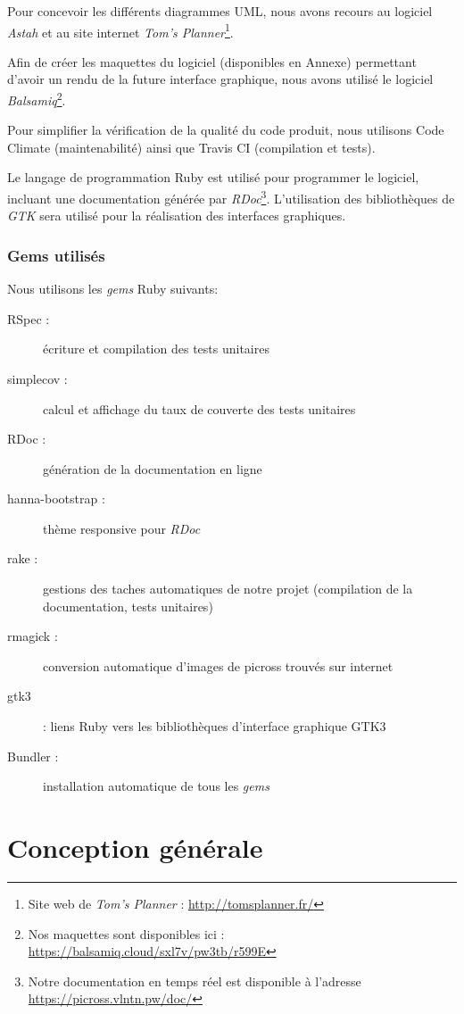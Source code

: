 \documentclass{report}
\makeatletter
\newcommand\footnoteref[1]{\protected@xdef\@thefnmark{\ref{#1}}\@footnotemark}
\makeatother
\begin{document}
	Pour concevoir les différents diagrammes UML, nous avons recours au logiciel \textit{Astah} et au site internet \textit{Tom's Planner}\footnote{Site web de \textit{Tom's Planner} : \url{http://tomsplanner.fr/}}.

	Afin de créer les maquettes du logiciel (disponibles en Annexe) permettant d’avoir un rendu de la future interface graphique, nous avons utilisé le logiciel \textit{Balsamiq}\footnote{Nos maquettes sont disponibles ici : \url{https://balsamiq.cloud/sxl7v/pw3tb/r599E}}.

	Pour simplifier la vérification de la qualité du code produit, nous utilisons Code Climate (maintenabilité) ainsi que Travis CI (compilation et tests).

	Le langage de programmation Ruby est utilisé pour programmer le logiciel, incluant une documentation générée par \textit{RDoc}\footnote{\label{rdoc}Notre documentation en temps réel est disponible à l'adresse \url{https://picross.vlntn.pw/doc/}}. L’utilisation des bibliothèques de \textit{GTK} sera utilisé pour la réalisation des interfaces graphiques.
	
	\subsection{Gems utilisés}
	Nous utilisons les \textit{gems} Ruby suivants:
	\begin{description}
	\item[RSpec :] écriture et compilation des tests unitaires
	\item[simplecov :] calcul et affichage du taux de couverte des tests unitaires
	\item[RDoc :] génération de la documentation en ligne \footnoteref{rdoc}
	\item[hanna-bootstrap :] thème responsive pour \textit{RDoc}
	\item[rake :] gestions des taches automatiques de notre projet (compilation de la documentation, tests unitaires)
	\item[rmagick :] conversion automatique d'images de picross trouvés sur internet
	\item[gtk3] : liens Ruby vers les bibliothèques d'interface graphique GTK3
	\item[Bundler :] installation automatique de tous les \textit{gems}
	\end{description}

		
\chapter{Conception générale}
\thispagestyle{empty}
\thispagestyle{plain}
\end{document}
